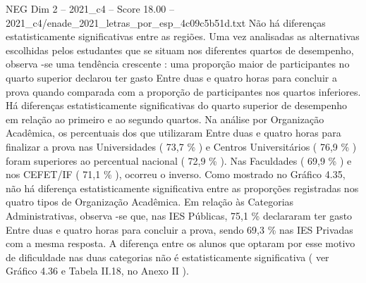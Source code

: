 \begin{textsample}{NEG Dim 2 – 2021\_c4 – Score 18.00 – 2021\_c4/enade\_2021\_letras\_por\_esp\_4c09c5b51d.txt}
Não há diferenças estatisticamente significativas entre as regiões.
Uma vez analisadas as alternativas escolhidas pelos estudantes que se situam nos diferentes quartos de desempenho, observa -se uma tendência crescente : uma proporção maior de participantes no quarto superior declarou ter gasto Entre duas e quatro horas para concluir a prova quando comparada com a proporção de participantes nos quartos inferiores.
Há diferenças estatisticamente significativas do quarto superior de desempenho em relação ao primeiro e ao segundo quartos.
Na análise por Organização Acadêmica, os percentuais dos que utilizaram Entre duas e quatro horas para finalizar a prova nas Universidades ( 73,7 \% ) e Centros Universitários ( 76,9 \% ) foram superiores ao percentual nacional ( 72,9 \% ).
Nas Faculdades ( 69,9 \% ) e nos CEFET/IF ( 71,1 \% ), ocorreu o inverso.
Como mostrado no Gráfico 4.35, não há diferença estatisticamente significativa entre as proporções registradas nos quatro tipos de Organização Acadêmica.
Em relação às Categorias Administrativas, observa -se que, nas IES Públicas, 75,1 \% declararam ter gasto Entre duas e quatro horas para concluir a prova, sendo 69,3 \% nas IES Privadas com a mesma resposta.
A diferença entre os alunos que optaram por esse motivo de dificuldade nas duas categorias não é estatisticamente significativa ( ver Gráfico 4.36 e Tabela II.18, no Anexo II ).

\end{textsample}
